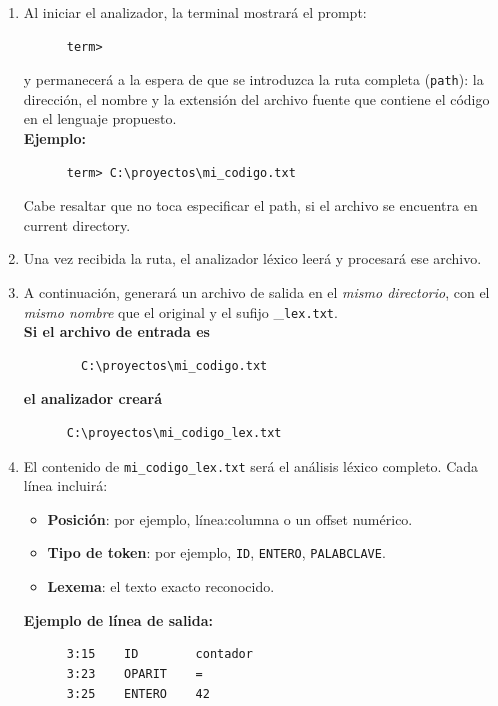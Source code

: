 \documentclass{article}
\begin{document}
\begin{enumerate}
  \item Al iniciar el analizador, la terminal mostrará el prompt:
    \begin{verbatim}
      term>
    \end{verbatim}
    y permanecerá a la espera de que se introduzca la ruta completa (\texttt{path}): 
    la dirección, el nombre y la extensión del archivo fuente que contiene 
    el código en el lenguaje propuesto.
    \\
    \textbf{Ejemplo:}
    \begin{verbatim}
      term> C:\proyectos\mi_codigo.txt
    \end{verbatim}

    Cabe resaltar que no toca especificar el path, si el archivo
    se encuentra en current directory.

  \item Una vez recibida la ruta, el analizador léxico leerá y procesará ese archivo.

  \item A continuación, generará un archivo de salida en el \emph{mismo directorio},
    con el \emph{mismo nombre} que el original y el sufijo \_\texttt{lex.txt}.
    \\
    \textbf{Si el archivo de entrada es}
    \begin{verbatim}
        C:\proyectos\mi_codigo.txt
    \end{verbatim}
    \textbf{el analizador creará}
    \begin{verbatim}
      C:\proyectos\mi_codigo_lex.txt
    \end{verbatim}

  \item El contenido de \texttt{mi\_codigo\_lex.txt} 
    será el análisis léxico completo. Cada línea incluirá:
    \begin{itemize}
      \item \textbf{Posición}: por ejemplo, línea:columna o un offset numérico.
      \item \textbf{Tipo de token}: por ejemplo, \texttt{ID}, \texttt{ENTERO}, \texttt{PALABCLAVE}.
      \item \textbf{Lexema}: el texto exacto reconocido.
    \end{itemize}
    \textbf{Ejemplo de línea de salida:}
    \begin{verbatim}
      3:15    ID        contador
      3:23    OPARIT    =
      3:25    ENTERO    42
    \end{verbatim}
\end{enumerate}
\end{document}
